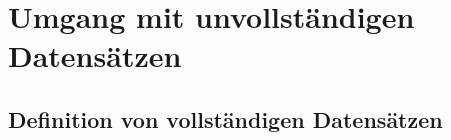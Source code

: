 \chapter{Umgang mit unvollständigen Datensätzen}\label{sec:incomplete-data}
\section{Definition von vollständigen Datensätzen}